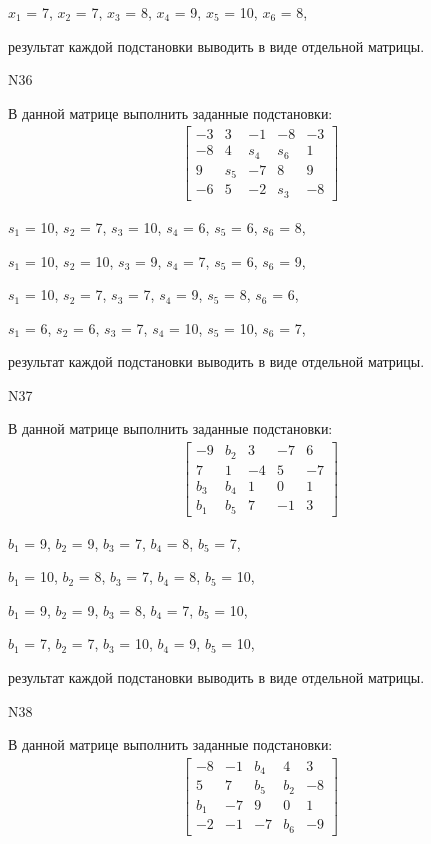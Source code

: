 \documentclass[11pt]{report}
\begin{document}
$x_{1}$ = 7, $x_{2}$ = 7, $x_{3}$ = 8, $x_{4}$ = 9, $x_{5}$ = 10, $x_{6}$ = 8, 

результат каждой подстановки выводить в виде отдельной матрицы.

N36

В данной матрице выполнить заданные подстановки:
\begin{align*}
\left[\begin{matrix}-3 & 3 & -1 & -8 & -3\\-8 & 4 & s_{4} & s_{6} & 1\\9 & s_{5} & -7 & 8 & 9\\-6 & 5 & -2 & s_{3} & -8\end{matrix}\right]
\end{align*}


$s_{1}$ = 10, $s_{2}$ = 7, $s_{3}$ = 10, $s_{4}$ = 6, $s_{5}$ = 6, $s_{6}$ = 8, 

$s_{1}$ = 10, $s_{2}$ = 10, $s_{3}$ = 9, $s_{4}$ = 7, $s_{5}$ = 6, $s_{6}$ = 9, 

$s_{1}$ = 10, $s_{2}$ = 7, $s_{3}$ = 7, $s_{4}$ = 9, $s_{5}$ = 8, $s_{6}$ = 6, 

$s_{1}$ = 6, $s_{2}$ = 6, $s_{3}$ = 7, $s_{4}$ = 10, $s_{5}$ = 10, $s_{6}$ = 7, 

результат каждой подстановки выводить в виде отдельной матрицы.

N37

В данной матрице выполнить заданные подстановки:
\begin{align*}
\left[\begin{matrix}-9 & b_{2} & 3 & -7 & 6\\7 & 1 & -4 & 5 & -7\\b_{3} & b_{4} & 1 & 0 & 1\\b_{1} & b_{5} & 7 & -1 & 3\end{matrix}\right]
\end{align*}


$b_{1}$ = 9, $b_{2}$ = 9, $b_{3}$ = 7, $b_{4}$ = 8, $b_{5}$ = 7, 

$b_{1}$ = 10, $b_{2}$ = 8, $b_{3}$ = 7, $b_{4}$ = 8, $b_{5}$ = 10, 

$b_{1}$ = 9, $b_{2}$ = 9, $b_{3}$ = 8, $b_{4}$ = 7, $b_{5}$ = 10, 

$b_{1}$ = 7, $b_{2}$ = 7, $b_{3}$ = 10, $b_{4}$ = 9, $b_{5}$ = 10, 

результат каждой подстановки выводить в виде отдельной матрицы.

N38

В данной матрице выполнить заданные подстановки:
\begin{align*}
\left[\begin{matrix}-8 & -1 & b_{4} & 4 & 3\\5 & 7 & b_{5} & b_{2} & -8\\b_{1} & -7 & 9 & 0 & 1\\-2 & -1 & -7 & b_{6} & -9\end{matrix}\right]
\end{align*}
\end{document}
